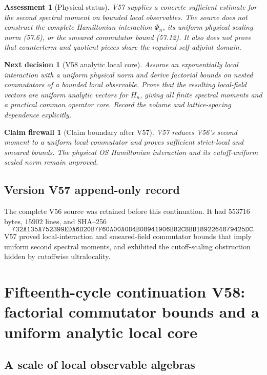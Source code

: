 \documentclass[11pt]{article}
\newtheorem{firewall}[theorem]{Claim firewall}
\newtheorem{decision}[theorem]{Next decision}
\newtheorem{assessment}[theorem]{Assessment}
\theoremstyle{remark}
\begin{document}
\begin{assessment}[Physical status]
\label{ass:v15v57-status}
V57 supplies a concrete sufficient estimate for the second spectral
moment on bounded local observables.  The source does not construct
the complete Hamiltonian interaction \(\Phi_n\), its uniform
physical scaling norm (57.6), or the smeared commutator bound
(57.12).  It also does not prove that counterterm and quotient
pieces share the required self-adjoint domain.
\end{assessment}

\begin{decision}[V58 analytic local core]
\label{dec:v15v57-next}
Assume an exponentially local interaction with a uniform physical
norm and derive factorial bounds on nested commutators of a bounded
local observable.  Prove that the resulting local-field vectors are
uniform analytic vectors for \(H_n\), giving all finite spectral
moments and a practical common operator core.  Record the volume
and lattice-spacing dependence explicitly.
\end{decision}

\begin{firewall}[Claim boundary after V57]
\label{fire:v15v57}
V57 reduces V56's second moment to a uniform local commutator and
proves sufficient strict-local and smeared bounds.  The physical OS
Hamiltonian interaction and its cutoff-uniform scaled norm remain
unproved.
\end{firewall}

\section*{Version V57 append-only record}
The complete V56 source was retained before this continuation.  It
had \(553716\) bytes, \(15902\) lines, and SHA--256
\[
 \texttt{732A135A752399EDA6D20B7F60A00A0D4B08941906B82C8BB1892264879425DC}.
\]
V57 proved local-interaction and smeared-field commutator bounds
that imply uniform second spectral moments, and exhibited the
cutoff-scaling obstruction hidden by cutoffwise ultralocality.

\chapter{Fifteenth-cycle continuation V58: factorial commutator bounds and a uniform analytic local core}
\label{sec:v15v58}

\section{A scale of local observable algebras}
\end{document}
